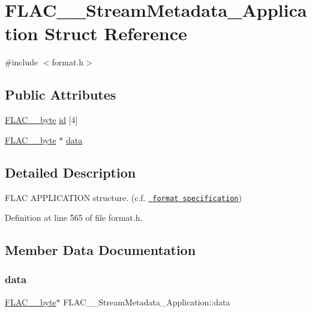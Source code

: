 \hypertarget{struct_f_l_a_c_____stream_metadata___application}{}\section{F\+L\+A\+C\+\_\+\+\_\+\+Stream\+Metadata\+\_\+\+Application Struct Reference}
\label{struct_f_l_a_c_____stream_metadata___application}


{\ttfamily \#include $<$format.\+h$>$}

\subsection*{Public Attributes}
\begin{DoxyCompactItemize}
\item 
\mbox{\hyperlink{ordinals_8h_a5eb569b12d5b047cdacada4d57924ee3}{F\+L\+A\+C\+\_\+\+\_\+byte}} \mbox{\hyperlink{struct_f_l_a_c_____stream_metadata___application_a0af01573d097b37b48b4a414318ec2ec}{id}} \mbox{[}4\mbox{]}
\item 
\mbox{\hyperlink{ordinals_8h_a5eb569b12d5b047cdacada4d57924ee3}{F\+L\+A\+C\+\_\+\+\_\+byte}} $\ast$ \mbox{\hyperlink{struct_f_l_a_c_____stream_metadata___application_a97a241798553043467ac1c94d7fe1319}{data}}
\end{DoxyCompactItemize}


\subsection{Detailed Description}
F\+L\+AC A\+P\+P\+L\+I\+C\+A\+T\+I\+ON structure. (c.\+f. \href{../format.html\#metadata_block_application}{\texttt{ format specification}}) 

Definition at line 565 of file format.\+h.



\subsection{Member Data Documentation}
\mbox{\label{struct_f_l_a_c_____stream_metadata___application_a97a241798553043467ac1c94d7fe1319}} 
\subsubsection{\texorpdfstring{data}{data}}
{\footnotesize\ttfamily \mbox{\hyperlink{ordinals_8h_a5eb569b12d5b047cdacada4d57924ee3}{F\+L\+A\+C\+\_\+\+\_\+byte}}$\ast$ F\+L\+A\+C\+\_\+\+\_\+\+Stream\+Metadata\+\_\+\+Application\+::data}



